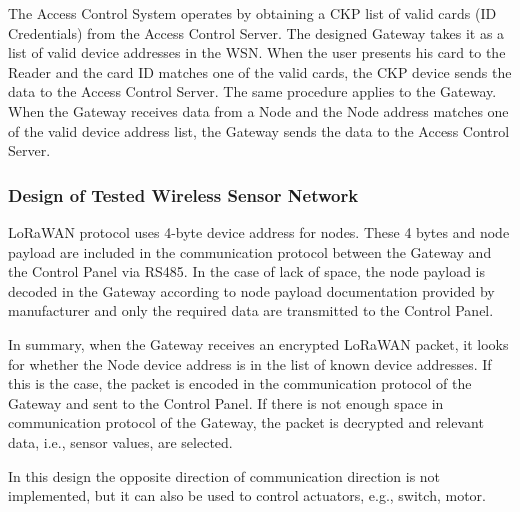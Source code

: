 The Access Control System operates by obtaining a CKP list of valid cards (ID Credentials) from the Access Control Server.
The designed Gateway takes it as a list of valid device addresses in the WSN.
When the user presents his card to the Reader and the card ID matches one of the valid cards, the CKP device sends the data to the Access Control Server.
The same procedure applies to the Gateway.
When the Gateway receives data from a Node and the Node address matches one of the valid device address list, the Gateway sends the data to the Access Control Server.


\subsubsection{Design of Tested Wireless Sensor Network}
LoRaWAN protocol uses 4-byte device address for nodes. These 4 bytes and node payload are included in the communication protocol between the Gateway and the Control Panel via RS485. In the case of lack of space, the node payload is decoded in the Gateway according to node payload documentation provided by manufacturer \cite{RHF1S001 pdf} and only the required data are transmitted to the Control Panel.


In summary, when the Gateway receives an encrypted LoRaWAN packet, it looks for whether the Node device address is in the list of known device addresses.
If this is the case, the packet is encoded in the communication protocol of the Gateway and sent to the Control Panel. If there is not enough space in communication protocol of the Gateway, the packet is decrypted and relevant data, i.e., sensor values, are selected.

In this design the opposite direction of communication direction is not implemented, but it can also be used to control actuators, e.g., switch, motor.


